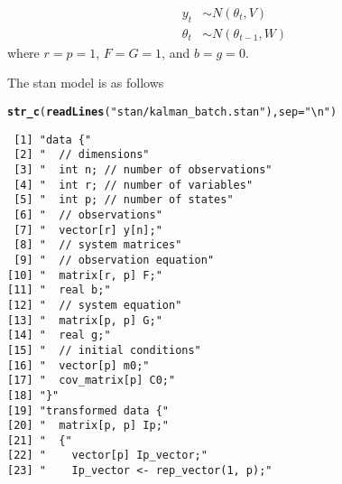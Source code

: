 \documentclass{article}\usepackage[]{graphicx}\usepackage[]{color}
\makeatletter
\newcommand{\hlstr}[1]{\textcolor[rgb]{0.192,0.494,0.8}{#1}}%
\newcommand{\hlstd}[1]{\textcolor[rgb]{0.345,0.345,0.345}{#1}}%
\newcommand{\hlkwc}[1]{\textcolor[rgb]{0.333,0.667,0.333}{#1}}%
\newcommand{\hlkwd}[1]{\textcolor[rgb]{0.737,0.353,0.396}{\textbf{#1}}}%
\newenvironment{kframe}{%
 \def\at@end@of@kframe{}%
 \ifinner\ifhmode%
  \def\at@end@of@kframe{\end{minipage}}%
  \begin{minipage}{\columnwidth}%
 \fi\fi%
 \def\FrameCommand##1{\hskip\@totalleftmargin \hskip-\fboxsep
 \colorbox{shadecolor}{##1}\hskip-\fboxsep
     \hskip-\linewidth \hskip-\@totalleftmargin \hskip\columnwidth}%
 \MakeFramed {\advance\hsize-\width
   \@totalleftmargin\z@ \linewidth\hsize
   \@setminipage}}%
 {\par\unskip\endMakeFramed%
 \at@end@of@kframe}
\newenvironment{knitrout}{}{} %
\makeatother
\begin{document}
\begin{align}
  y_{t} &\sim N(\theta_{t}, V) \\
  \theta_{t} &\sim N(\theta_{t - 1}, W)
\end{align}
where $r = p = 1$, $F = G = 1$, and $b = g = 0$.

The stan model is as follows
\begin{knitrout}
\color{fgcolor}\begin{kframe}
\begin{alltt}
\hlkwd{str_c}\hlstd{(}\hlkwd{readLines}\hlstd{(}\hlstr{"stan/kalman_batch.stan"}\hlstd{),} \hlkwc{sep} \hlstd{=} \hlstr{"\textbackslash{}n"}\hlstd{)}
\end{alltt}
\begin{verbatim}
 [1] "data {"                                                                  
 [2] "  // dimensions"                                                         
 [3] "  int n; // number of observations"                                      
 [4] "  int r; // number of variables"                                         
 [5] "  int p; // number of states"                                            
 [6] "  // observations"                                                       
 [7] "  vector[r] y[n];"                                                       
 [8] "  // system matrices"                                                    
 [9] "  // observation equation"                                               
[10] "  matrix[r, p] F;"                                                       
[11] "  real b;"                                                               
[12] "  // system equation"                                                    
[13] "  matrix[p, p] G;"                                                       
[14] "  real g;"                                                               
[15] "  // initial conditions"                                                 
[16] "  vector[p] m0;"                                                         
[17] "  cov_matrix[p] C0;"                                                     
[18] "}"                                                                       
[19] "transformed data {"                                                      
[20] "  matrix[p, p] Ip;"                                                      
[21] "  {"                                                                     
[22] "    vector[p] Ip_vector;"                                                
[23] "    Ip_vector <- rep_vector(1, p);"                                      

\end{verbatim}
\end{kframe}
\end{knitrout}
\end{document}
